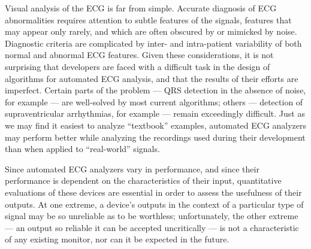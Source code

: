 Visual analysis of the ECG is far from simple.  Accurate diagnosis of
ECG abnormalities requires attention to subtle features of the
signals, features that may appear only rarely, and which are often
obscured by or mimicked by noise.  Diagnostic criteria are complicated
by inter- and intra-patient variability of both normal and abnormal
ECG features.  Given these considerations, it is not surprising that
developers are faced with a difficult task in the design of algorithms
for automated ECG analysis, and that the results of their efforts are
imperfect.  Certain parts of the problem --- QRS detection in the
absence of noise, for example --- are well-solved by most current
algorithms;  others --- detection of supraventricular arrhythmias, for
example --- remain exceedingly difficult.  Just as we may find it easiest
to analyze ``textbook'' examples, automated ECG analyzers may perform
better while analyzing the recordings used during their development
than when applied to ``real-world'' signals.

Since automated ECG analyzers vary in performance, and since their
performance is dependent on the characteristics of their input,
quantitative evaluations of these devices are essential in order to
assess the usefulness of their outputs.  At one extreme, a device's
outputs in the context of a particular type of signal may be so
unreliable as to be worthless;  unfortunately, the other extreme ---
an output so reliable it can be accepted uncritically --- is not a
characteristic of any existing monitor, nor can it be expected in
the future.


